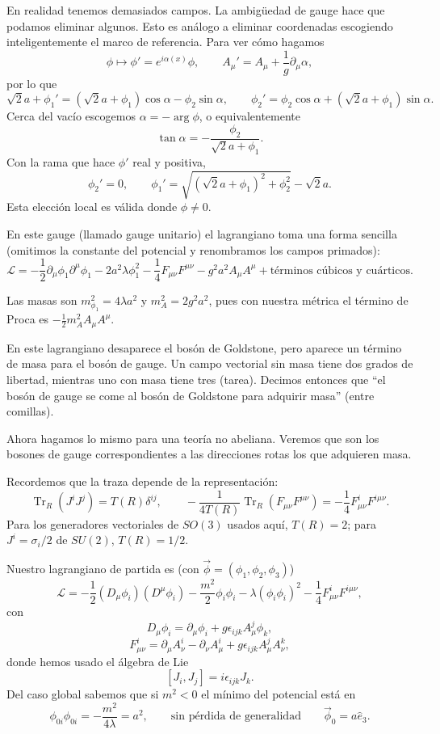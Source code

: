 \documentclass[11pt,a4paper]{article}
\newcommand{\concept}[1]{\textcolor{concept-green}{#1}}
\newcommand{\Tr}{\operatorname{Tr}}
\begin{document}
En realidad tenemos demasiados campos. La ambigüedad de gauge hace que podamos
eliminar algunos. Esto es análogo a eliminar coordenadas escogiendo
inteligentemente el marco de referencia. Para ver cómo hagamos
\[
  \phi\longmapsto\phi'=e^{i\alpha(x)}\phi,
  \qquad A_\mu'=A_\mu+\frac1g\partial_\mu\alpha,
\]
por lo que
\[
  \sqrt2a+\phi_1'=(\sqrt2a+\phi_1)\cos\alpha-\phi_2\sin\alpha,
  \qquad
  \phi_2'=\phi_2\cos\alpha+(\sqrt2a+\phi_1)\sin\alpha.
\]
Cerca del vacío escogemos $\alpha=-\arg\phi$, o equivalentemente
\[
  \tan\alpha=-\frac{\phi_2}{\sqrt2a+\phi_1}.
\]
Con la rama que hace $\phi'$ real y positiva,
\[
  \phi_2'=0,\qquad
  \phi_1'=\sqrt{(\sqrt2a+\phi_1)^2+\phi_2^2}-\sqrt2a.
\]
Esta elección local es válida donde $\phi\neq0$.

En este gauge (llamado gauge \concept{unitario}) el lagrangiano toma una forma
sencilla (omitimos la constante del potencial y renombramos los campos primados):
\[
  \mathcal L
  =-\frac12\partial_\mu\phi_1\partial^\mu\phi_1
   -2a^2\lambda\phi_1^2
   -\frac14F_{\mu\nu}F^{\mu\nu}
   -g^2a^2A_\mu A^\mu
   +\text{términos cúbicos y cuárticos}.
\]

Las masas son $m_{\phi_1}^2=4\lambda a^2$ y $m_A^2=2g^2a^2$,
pues con nuestra métrica el término de Proca es
$-\frac12m_A^2A_\mu A^\mu$.

En este lagrangiano desaparece el bosón de Goldstone, pero aparece un término de
masa para el bosón de gauge. Un campo vectorial sin masa tiene dos grados de
libertad, mientras uno con masa tiene tres (tarea). Decimos entonces que
``el bosón de gauge se come al bosón de Goldstone para adquirir masa'' (entre
comillas).

Ahora hagamos lo mismo para una teoría no abeliana. Veremos que son los bosones
de gauge correspondientes a las direcciones rotas los que adquieren masa.

Recordemos que la traza depende de la representación:
\[
  \Tr_R(J^iJ^j)=T(R)\delta^{ij},
  \qquad
  -\frac{1}{4T(R)}\Tr_R(F_{\mu\nu}F^{\mu\nu})
  =-\frac14F_{\mu\nu}^iF^{i\mu\nu}.
\]
Para los generadores vectoriales de $SO(3)$ usados aquí, $T(R)=2$;
para $J^i=\sigma_i/2$ de $SU(2)$, $T(R)=1/2$.

Nuestro lagrangiano de partida es (con $\vec\phi=(\phi_1,\phi_2,\phi_3)$)
\[
  \mathcal L
  =-\frac12(D_\mu\phi_i)(D^\mu\phi_i)
   -\frac{m^2}{2}\phi_i\phi_i
   -\lambda(\phi_i\phi_i)^2
   -\frac14F_{\mu\nu}^iF^{i\mu\nu},
\]
con
\[
  D_\mu\phi_i=\partial_\mu\phi_i+g\epsilon_{ijk}A_\mu^j\phi_k,
\]
\[
  F_{\mu\nu}^i
  =\partial_\mu A_\nu^i-\partial_\nu A_\mu^i
   +g\epsilon_{ijk}A_\mu^jA_\nu^k,
\]
donde hemos usado el álgebra de Lie
\[
  [J_i,J_j]=i\epsilon_{ijk}J_k.
\]
Del caso global sabemos que si $m^2<0$ el mínimo del potencial está en
\[
  \phi_{0i}\phi_{0i}=-\frac{m^2}{4\lambda}=a^2,
  \qquad
  \text{sin pérdida de generalidad}\qquad
  \vec\phi_0=a\hat e_3.
\]
\end{document}
